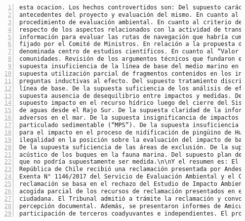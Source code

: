 \begin{Verbatim}[frame=lines, label=Elavoración propia -  Ejemplo de Contexto enviado por el Chatbot a OpenAI
				, fontsize=\scriptsize, numbers=left
				, baselinestretch=0.4
				, formatcom=\color{gray}]
esta ocacion. Los hechos controvertidos son: Del supuesto carácter completo de los
antecedentes del proyecto y evaluación del mismo. En cuanto al término anticipado del
procedimiento de evaluación ambiental. En cuanto al criterio del propio Comité de Ministros
respecto de los aspectos relacionados con la actividad de transporte marítimo. De la supuesta
información para evaluar las rutas de navegación que habría cumplido con creces el estándar
fijado por el Comité de Ministros. En relación a la propuesta de la casa del Mar, luego
denominada centro de estudios científicos. En cuanto al “Valor Compartido” con las
comunidades. Revisión de los argumentos técnicos que fundaron el rechazo del proyecto. De la
supuesta insuficiencia de la línea de base del medio marino en las rutas de navegación. De la
supuesta utilización parcial de fragmentos contenidos en los informes de los Servicios, con
preguntas inductivas al efecto. Del supuesto tratamiento discriminatorio en lo relativo a la
línea de base. De la supuesta suficiencia de los análisis de efectos sinérgicos. De la
supuesta ausencia de desequilibrio entre impactos y medidas. De las Reclamaciones PAC. Del
supuesto impacto en el recurso hídrico luego del cierre del Sistema de Captación y Devolución
de aguas desde el Rajo Sur. De la supuesta claridad de la información para descartar impactos
adversos en el mar. De la supuesta insignificancia de impactos por aporte de material
particulado sedimentable (“MPS”). De la supuesta insuficiencia de la medida de compensación
para el impacto en el proceso de nidificación de pingüino de Humboldt. De la supuesta
ilegalidad en la posición sobre la evaluación del impacto de barreras eólicas en la avifauna.
De la supuesta suficiencia de las áreas de exclusión. De la supuesta evaluación del impacto
acústico de los buques en la fauna marina. Del supuesto plan de monitoreo de aves y cetáceos
que no podría supuestamente ser medida.\n\nY el resumen es: El Primer Tribunal Ambiental de la
República de Chile recibió una reclamación presentada por Andes Iron SpA contra la Resolución
Exenta N° 1146/2017 del Servicio de Evaluación Ambiental y el Comité de Ministros. La
reclamación se basa en el rechazo del Estudio de Impacto Ambiental del proyecto Dominga y la
acogida parcial de los recursos de reclamación presentados en el marco de la participación
ciudadana. El Tribunal admitió a trámite la reclamación y convocó a una audiencia de
percepción documental. Además, se presentaron informes de Amicus Curiae y se aceptó la
participación de terceros coadyuvantes e independientes. El proceso judicial continúa y se

\end{Verbatim}
